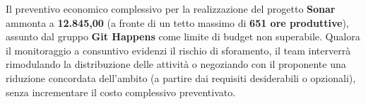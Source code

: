 \vspace{3mm}
\noindent
Il preventivo economico complessivo per la realizzazione del progetto \textbf{Sonar} ammonta a \textbf{\texteuro{} 12.845,00} (a fronte di un tetto massimo di \textbf{651 ore produttive}), assunto dal gruppo \textbf{Git Happens} come limite di budget non superabile. Qualora il monitoraggio a consuntivo evidenzi il rischio di sforamento, il team interverrà rimodulando la distribuzione delle attività o negoziando con il proponente una riduzione concordata dell'ambito (a partire dai requisiti desiderabili o opzionali), senza incrementare il costo complessivo preventivato.

